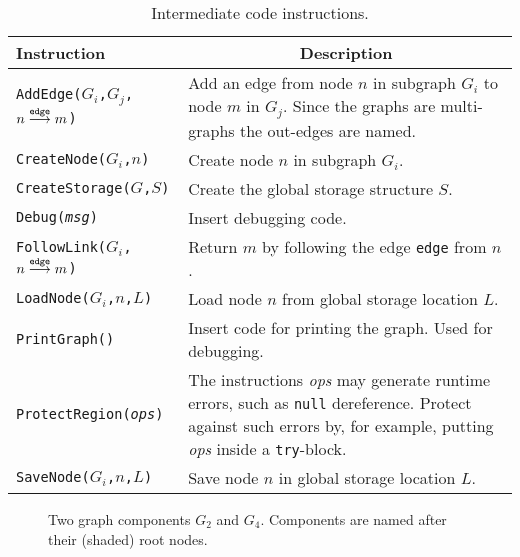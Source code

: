 \begin{table}
\begin{center}
\begin{tabular}{|l|p{10cm}|}\hline
\sc Instruction & \multicolumn{1}{|c|}{\sc Description} \\\hline\hline
\tt AddEdge($G_i$,$G_j$,$n\stackrel{{\tt edge}}{\longrightarrow}m$) & 
    Add an edge from node $n$ in subgraph $G_i$ to node $m$ in $G_j$. 
    Since the graphs are multi-graphs the out-edges are named. \\\hline
\tt CreateNode($G_i$,$n$) & Create node $n$ in subgraph $G_i$. \\\hline
\tt CreateStorage($G$,$S$) & Create the global storage structure $S$. \\\hline
\tt Debug({\em msg}) & Insert debugging code.\\\hline
\tt FollowLink($G_i$,$n\stackrel{{\tt edge}}{\longrightarrow}m$) & Return $m$ by
     following the edge {\tt edge} from $n$.\\\hline
\tt LoadNode($G_i$,$n$,$L$) & Load node $n$ from global storage location $L$.\\\hline
\tt PrintGraph() & Insert code for printing the graph. Used for debugging.\\\hline
\tt ProtectRegion({\em ops}) & The instructions {\em ops} may generate runtime
                               errors, such as {\tt null} dereference. Protect
                               against such errors by, for example, putting
                               {\em ops} inside a {\tt try}-block. \\\hline
\tt SaveNode($G_i$,$n$,$L$) & Save node $n$ in global storage location $L$. \\\hline
\end{tabular}
\end{center}
\caption{Intermediate code instructions.}
\label{IRops}
\end{table}

\begin{figure}
\begin{center}

\end{center}
\caption{Two graph components $G_2$ and $G_4$. Components are 
         named after their (shaded) root nodes.}
\label{CTexample1}
\end{figure}

